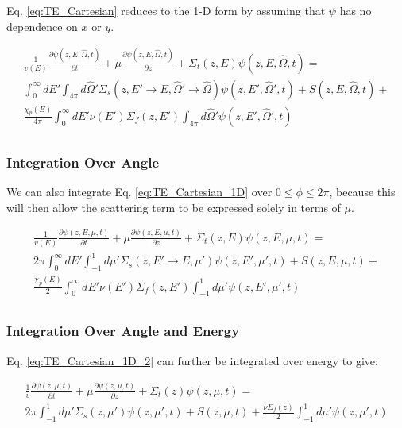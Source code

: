 \documentclass[10pt]{article}
\newcommand{\hO}{\hat{\Omega}}
\begin{document}
\begin{flushleft}
Eq. \ref{eq:TE_Cartesian} reduces to the 1-D form by assuming that \(\psi\) has no dependence on \(x\) or \(y\). 

\begin{equation}
\label{eq:TE_Cartesian_1D}
\begin{aligned}
\frac{1}{v(E)} \frac{\partial\psi(z, E, \hO  ,t)}{\partial t} +
 \mu \frac{\partial \psi(z, E, \hO  ,t)}{\partial z} + \Sigma_t(z,E)\psi(z, E, \hO  ,t) = \\
 \int_{0}^{\infty}dE' \int_{4\pi}^{ } d\hO  ' \Sigma_s(z, E'\rightarrow E, \hO  '\rightarrow\hO  )\psi(z, E', \hO  ',t) + S(z, E, \hO  ,t)+\\
 \frac{\chi_p(E)}{4\pi} \int_{0}^{\infty} dE'\nu(E')\Sigma_f(z, E')\int_{4\pi}^{} d\hO  '\psi(z, E', \hO  ',t)\\
\end{aligned}
\end{equation}

\subsubsection{Integration Over Angle}

We can also integrate Eq. \ref{eq:TE_Cartesian_1D} over \(0\leq \phi \leq 2\pi\), because this will then allow the scattering term to be expressed solely in terms of \(\mu\). 

\begin{equation}
\label{eq:TE_Cartesian_1D_2}
\begin{aligned}
\frac{1}{v(E)} \frac{\partial\psi(z, E, \mu,t)}{\partial t} + \mu \frac{\partial \psi(z, E, \mu,t)}{\partial z} +
 \Sigma_t(z,E)\psi(z, E, \mu,t) =\\
 2\pi \int_{0}^{\infty}dE' \int_{-1}^{1} d\mu' \Sigma_s(z, E'\rightarrow E, \mu')\psi(z, E', \mu',t) + S(z, E, \mu, t)+\\
 \frac{\chi_p(E)}{2} \int_{0}^{\infty} dE'\nu(E')\Sigma_f(z, E')\int_{-1}^{1} d\mu'\psi(z, E', \mu',t)\\
\end{aligned}
\end{equation}

\subsubsection{Integration Over Angle and Energy}
Eq. \eqref{eq:TE_Cartesian_1D_2} can further be integrated over energy to give:

\begin{equation}
\label{eq:TE_Cartesian_1D_2_noenergy}
\begin{aligned}
\frac{1}{v} \frac{\partial\psi(z, \mu,t)}{\partial t} + \mu \frac{\partial \psi(z, \mu,t)}{\partial z} +
 \Sigma_t(z)\psi(z, \mu,t) =\\
 2\pi\int_{-1}^{1} d\mu' \Sigma_s(z, \mu')\psi(z,\mu',t) + S(z, \mu, t)+\frac{\nu\Sigma_f(z)}{2}\int_{-1}^{1} d\mu'\psi(z, \mu',t)\\
\end{aligned}
\end{equation}


\end{flushleft}
\end{document}

